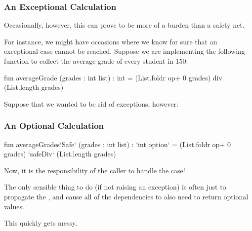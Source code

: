 \documentclass[aspectratio=169, handout]{beamer}
\begin{document}
\begin{frame}[fragile]
  \frametitle{An Exceptional Calculation}

  Occasionally, however, this can prove to be more of a burden than a
  safety net.

  \pause
  \vspace{\fill}

  For instance, we might have occasions where we know for sure that
  an exceptional case cannot be reached. Suppose we are implementing
  the following function to collect the average grade of every
  student in 150:

  \pause
  \begin{codeblock}
    fun averageGrade (grades : int list) : int =
      (List.foldr op+ 0 grades)
      div
      (List.length grades)
  \end{codeblock}

  \pause
  \vspace{\fill}

  Suppose that we wanted to be rid of exceptions, however:
\end{frame}

\begin{frame}[fragile]
  \frametitle{An Optional Calculation}

  \begin{codeblock}
    fun averageGrades`Safe` (grades : int list) : `int option` =
      (List.foldr op+ 0 grades)
      `safeDiv`
      (List.length grades)
  \end{codeblock}

  \pause
  \vspace{\fill}

  Now, it is the responsibility of the caller to handle the  case!

  \pause
  \vspace{\fill}

  The only sensible thing to do (if not raising an exception) is often just to
  propagate the , and cause all of the dependencies to also need
  to return optional values.

  \pause
  \vspace{\fill}

  This quickly gets messy.
\end{frame}
\end{document}
